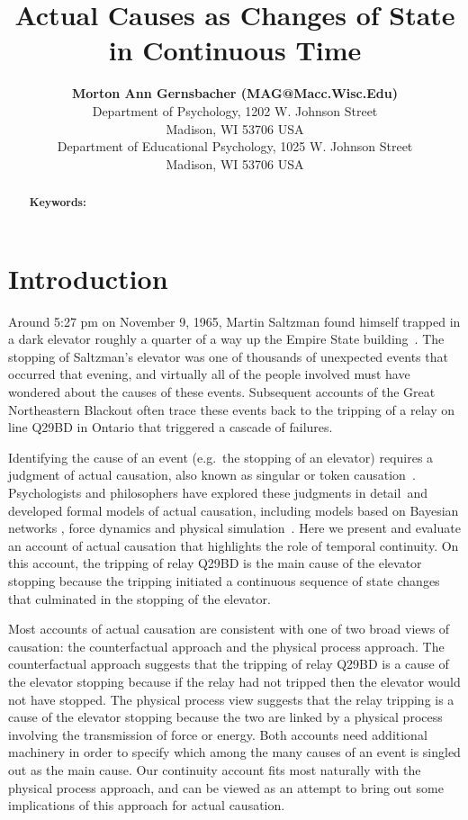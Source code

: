 \documentclass[10pt,letterpaper]{article}
\title{Actual Causes as Changes of State in Continuous Time}
\author{{\large \bf Morton Ann Gernsbacher (MAG@Macc.Wisc.Edu)} \\
  Department of Psychology, 1202 W. Johnson Street \\
  Madison, WI 53706 USA
  \AND {\large \bf Sharon J.~Derry (SDJ@Macc.Wisc.Edu)} \\
  Department of Educational Psychology, 1025 W. Johnson Street \\
  Madison, WI 53706 USA}
\begin{document}
\maketitle


\begin{abstract}

\textbf{Keywords:} 
\end{abstract}


\section{Introduction}

Around 5:27 pm on November 9, 1965, Martin Saltzman found himself trapped in a dark elevator roughly a quarter of a way up the Empire State building~\cite{gelbr1965night}. The stopping of Saltzman's elevator was one of thousands of unexpected events that occurred that evening, and virtually all of the people involved must have wondered about the causes of these events. Subsequent accounts of the Great Northeastern Blackout often trace these events back to the tripping of a relay on line Q29BD in Ontario that triggered a cascade of failures.

Identifying the cause of an event (e.g.\ the stopping of an elevator) requires a judgment of actual causation, also known as singular or token causation~\cite{danks17}. Psychologists and philosophers have explored these judgments in detail~and developed formal models of actual causation, including models based on Bayesian networks \cite{}, force dynamics \cite{wolff} and physical simulation~\cite{gerstenberg}.  Here we present and evaluate an account of actual causation that highlights the role of temporal continuity.  On this account, the tripping of relay Q29BD is the main cause of the elevator stopping because the tripping initiated a continuous sequence of state changes that culminated in the stopping of the elevator.

Most accounts of actual causation are consistent with one of two broad views of causation: the counterfactual approach and the physical process approach. The counterfactual approach suggests that the tripping of relay Q29BD is a cause of the elevator stopping because if the relay had not tripped then the elevator would not have stopped. The physical process view suggests that the relay tripping is a cause of the elevator stopping because the two are linked by a physical process involving the transmission of force or energy.  Both accounts need additional machinery in order to specify which among the many causes of an event is singled out as the main cause. Our continuity account fits most naturally with the physical process approach, and can be viewed as an attempt to bring out some implications of this approach for actual causation. 
\end{document}
